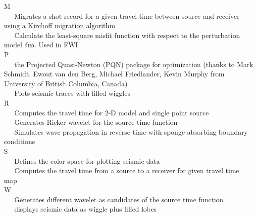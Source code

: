 \documentclass[11pt,titlepage]{article}
\newcommand{\bm}{\boldsymbol{m}}
\theoremstyle{plain}
\theoremstyle{definition}
\theoremstyle{remark}
\numberwithin{equation}{section}
\begin{document}
\noindent M\\
~~~Migrates a shot record for a given travel time between source and receiver using a Kirchoff migration algorithm\\
~~~Calculate the least-square misfit function with respect to the perturbation model $\delta \bm$. Used in FWI\\

\noindent P\\
~~~the Projected Quasi-Newton (PQN) package for optimization (thanks to Mark Schmidt, Ewout van den Berg, Michael Friedlander, Kevin Murphy from University of British Columbia, Canada)\\
~~~Plots seismic traces with filled wiggles\\

\noindent R\\
~~~Computes the travel time for 2-D model and single point source\\
~~~Generates Ricker wavelet for the source time function\\
~~~Simulates wave propagation in reverse time with sponge absorbing boundary conditions\\

\noindent S\\
~~~Defines the color space for plotting seismic data\\
~~~Computes the travel time from a source to a receiver for given travel time map\\

\noindent W\\
~~~Generates different wavelet as candidates of the source time function\\
~~~displays seismic data as wiggle plus filled lobes\\





\end{document}

